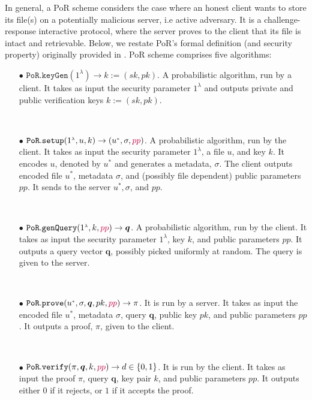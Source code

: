 
In general, a PoR scheme considers the case where an honest client wants to store its file(s) on a  potentially malicious server, i.e active adversary. It is a challenge-response interactive protocol, where the server proves to the client that its file is intact and retrievable. Below, we restate PoR's formal definition (and security property) originally provided in \cite{DBLP:journals/iacr/JuelsK07,DBLP:conf/asiacrypt/ShachamW08}. PoR scheme comprises five algorithms: 

\begin{itemize}
\item[$\bullet$] $\mathtt{PoR.keyGen}(1^{\scriptscriptstyle\lambda})\rightarrow k:=(sk,pk)$.  A probabilistic algorithm, run by a client. It takes as input the security parameter  $1^{\scriptscriptstyle\lambda}$ and outputs  private and public verification keys $k:=(sk,pk)$.

\

\item[$\bullet$] $\mathtt{PoR.setup}(1^{\scriptscriptstyle\lambda}, u,k)\rightarrow (u^{\scriptscriptstyle *}, \sigma, {\color{purple}pp})$. A probabilistic algorithm, run by the client. It takes as input the security parameter $1^{\scriptscriptstyle\lambda}$,  a file $u$, and key $k$. It encodes $u$, denoted by $u^{\scriptscriptstyle *}$ and generates  a metadata, $\sigma$.  The client outputs encoded file $u^{\scriptscriptstyle *}$, metadata $\sigma$, and  {\color{purple}(possibly file dependent) public parameters $pp$}. It sends to the server   $u^{\scriptscriptstyle *},\sigma$, and {\color{purple}$pp$}.

\

\item[$\bullet$] $\mathtt{PoR.genQuery}(1^{\scriptscriptstyle\lambda},k,{\color{purple}pp})\rightarrow \bm{q}$. A probabilistic algorithm, run by the client. It takes as input the security parameter  $1^{\scriptscriptstyle\lambda}$,  key $k$, and {\color{purple} public parameters $pp$}. It outputs a  query vector $\bm{q}$, possibly picked uniformly at random. The query is given to the server. 

\

\item[$\bullet$] $\mathtt{PoR.prove}(u^{\scriptscriptstyle *}, \sigma,\bm{q},pk,{\color{purple}pp})\rightarrow \pi$. It is run by a server.  It takes as input the encoded file $u^{\scriptscriptstyle *}$, metadata $\sigma$, query $\bm{q}$,  public key $pk$, and {\color{purple} public parameters $pp$}. It  outputs a proof, $\pi$, given to the client. 

\

\item[$\bullet$] $\mathtt{PoR.verify}(\pi,\bm{q},k,{\color{purple}pp})\rightarrow d\in\{0,1\}$. It is run by the client. It takes as input the proof $\pi$,  query $\bm{q}$,  key pair $k$, and {\color{purple} public parameters $pp$}. It outputs either $0$ if it rejects,  or $1$ if it accepts the proof. 

\end{itemize}


